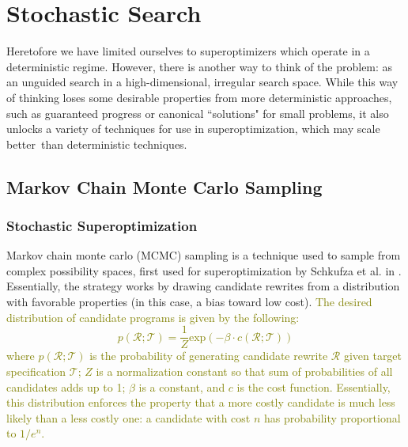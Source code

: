 \documentclass[12pt,twoside]{reedthesis}
\newcommand{\green}[1]{\textcolor{olive}{#1}}
\begin{document}

\chapter{Stochastic Search}
    Heretofore we have limited ourselves to superoptimizers which operate in a deterministic regime.
    However, there is another way to think of the problem: as an unguided search in a high-dimensional, irregular search space.
    While this way of thinking loses some desirable properties from more deterministic approaches, such as guaranteed progress or canonical ``solutions" for small problems, it also unlocks a variety of techniques for use in superoptimization, which may scale better\footnotemark\, than deterministic techniques.
    

    \section{Markov Chain Monte Carlo Sampling}
    \subsection{Stochastic Superoptimization}
        Markov chain monte carlo (MCMC) sampling is a technique used to sample from complex possibility spaces, first used for superoptimization by Schkufza et al. in \cite{schkufza2013stoke}.
        Essentially, the strategy works by drawing candidate rewrites from a distribution with favorable properties (in this case, a bias toward low cost). \green{The desired distribution of candidate programs is given by the following:
        \[
            p(\mathcal{R;T}) = \frac{1}{Z} \mathrm{exp}\left(-\beta \cdot c(\mathcal{R;T})\right)
        \]
        where $p(\mathcal{R;T})$ is the probability of generating candidate rewrite $\mathcal{R}$ given target specification $\mathcal{T}$; $Z$ is a normalization constant so that sum of probabilities of all candidates adds up to 1; $\beta$ is a constant, and $c$ is the cost function. 
        Essentially, this distribution enforces the property that a more costly candidate is much less likely than a less costly one: a candidate with cost $n$ has probability proportional to $1/e^n$.
        }
\end{document}
